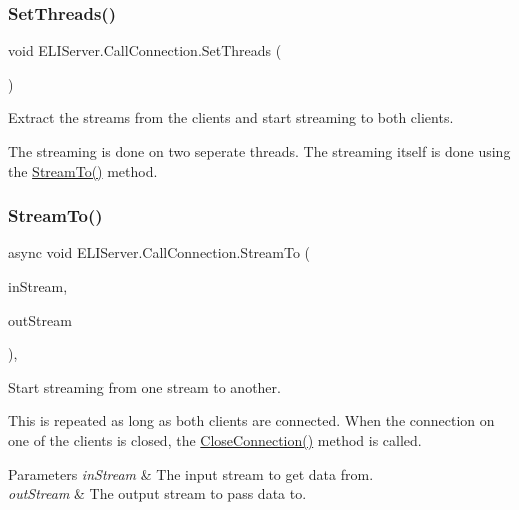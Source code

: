 \subsubsection{\texorpdfstring{Set\+Threads()}{SetThreads()}}
{\footnotesize\ttfamily void E\+L\+I\+Server.\+Call\+Connection.\+Set\+Threads (\begin{DoxyParamCaption}{ }\end{DoxyParamCaption})\hspace{0.3cm}{\ttfamily [inline]}}





Extract the streams from the clients and start streaming to both clients.

The streaming is done on two seperate threads. The streaming itself is done using the \hyperlink{class_e_l_i_server_1_1_call_connection_a01514395594e70da5e9acb48d908a238}{Stream\+To()} method. \mbox{\label{class_e_l_i_server_1_1_call_connection_a01514395594e70da5e9acb48d908a238}} 
\subsubsection{\texorpdfstring{Stream\+To()}{StreamTo()}}
{\footnotesize\ttfamily async void E\+L\+I\+Server.\+Call\+Connection.\+Stream\+To (\begin{DoxyParamCaption}\item[{Network\+Stream}]{in\+Stream,  }\item[{Network\+Stream}]{out\+Stream }\end{DoxyParamCaption})\hspace{0.3cm}{\ttfamily [inline]}, {\ttfamily [private]}}





Start streaming from one stream to another.

This is repeated as long as both clients are connected. When the connection on one of the clients is closed, the \hyperlink{class_e_l_i_server_1_1_call_connection_a58cfbc1878bb29632972ed7c21c580bb}{Close\+Connection()} method is called. 


\begin{DoxyParams}{Parameters}
{\em in\+Stream} & The input stream to get data from.\\
\hline
{\em out\+Stream} & The output stream to pass data to.\\
\hline
\end{DoxyParams}



